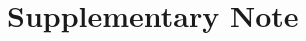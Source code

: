 \graphicspath{{./content/chap1_diff_in_graphs/figures/}}

\setcounter{equation}{0}
\setcounter{figure}{0}
\setcounter{table}{0}
\makeatletter %
\renewcommand{\thetable}{S\arabic{table}}
\renewcommand{\theequation}{S\arabic{equation}}
\renewcommand{\thefigure}{S\arabic{figure}}
\makeatother %

\section{Supplementary Note}
    \label{secSI:supmat}

